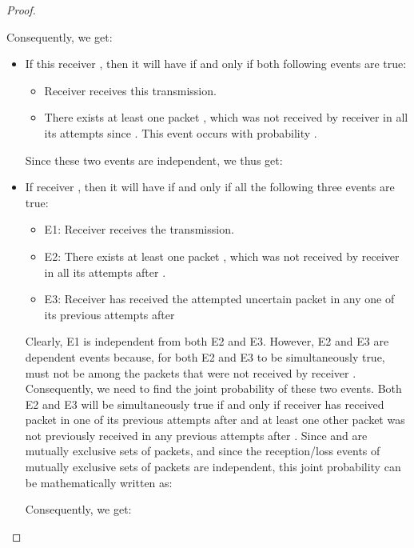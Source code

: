 \documentclass[10pt,jounral]{IEEEtran}
\newcommand{\ignore}[1]{}
\begin{document}
\begin{proof}
\begin{singlecol}
\begin{itemize}
 Consequently, we get:

\end{itemize}
\end{singlecol}
\begin{doublecol}
\begin{itemize}
\item If this receiver , then it will have  if and only if both following events are true:
    \begin{itemize}
    \item Receiver  receives this transmission.
     \item There exists at least one packet , which was not received by receiver  in all its attempts since . This event occurs with probability .
     \end{itemize}
     Since these two events are independent, we thus get:

\ignore{where  is referred to as the completion probability of receiver , defined as the probability that receiver  has completed the reception of all its wanted packets in previous attempts from the sender.}
\item If receiver , then it will have   if and only if all the following three events are true:
   \begin{itemize}
   \item E1: Receiver  receives the transmission.
   \item E2: There exists at least one packet , which was not received by receiver  in all its attempts after .
   \item E3: Receiver  has received the attempted uncertain packet  in any one of its previous attempts after 
   \end{itemize}
   Clearly, E1 is independent from both E2 and E3. However, E2 and E3 are dependent events because, for both E2 and E3 to be simultaneously true,  must not be among the packets that were not received by receiver \ignore{ for E2 to be true}. Consequently, we need to find the joint probability of these two events. Both E2 and E3 will be simultaneously true if and only if receiver  has received packet  in one of its previous attempts after  and at least one other packet  was not previously received in any previous attempts after . Since  and  are mutually exclusive sets of packets, and since the reception/loss events of mutually exclusive sets of packets are independent, this joint probability can be mathematically written as:
   

 Consequently, we get:


\end{itemize}
\end{doublecol}
\end{proof}
\end{document}
